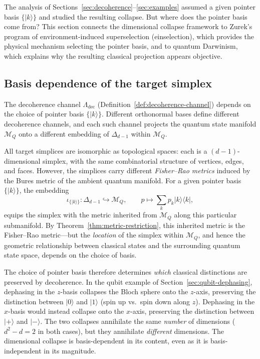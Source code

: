 \documentclass[12pt,a4paper]{article}
\theoremstyle{definition}
\theoremstyle{remark}
\begin{document}
The analysis of Sections~\ref{sec:decoherence}--\ref{sec:examples} assumed a given pointer basis $\{|k\rangle\}$ and studied the resulting collapse.  But where does the pointer basis come from?  This section connects the dimensional collapse framework to Zurek's program of environment-induced superselection (einselection), which provides the physical mechanism selecting the pointer basis, and to quantum Darwinism, which explains why the resulting classical projection appears objective.

\subsection{Basis dependence of the target simplex}
\label{sec:basis-dependence}

The decoherence channel $\Lambda_{\mathrm{dec}}$ (Definition~\ref{def:decoherence-channel}) depends on the choice of pointer basis $\{|k\rangle\}$.  Different orthonormal bases define different decoherence channels, and each such channel projects the quantum state manifold $\mathcal{M}_Q$ onto a different embedding of $\Delta_{d-1}$ within $\mathcal{M}_Q$.

All target simplices are isomorphic as topological spaces: each is a $(d-1)$-dimensional simplex, with the same combinatorial structure of vertices, edges, and faces.  However, the simplices carry different \emph{Fisher--Rao metrics} induced by the Bures metric of the ambient quantum manifold.  For a given pointer basis $\{|k\rangle\}$, the embedding
\begin{equation}
\label{eq:simplex-embedding}
\iota_{\{|k\rangle\}}: \Delta_{d-1} \hookrightarrow \mathcal{M}_Q, \qquad p \mapsto \sum_k p_k |k\rangle\langle k|,
\end{equation}
equips the simplex with the metric inherited from $\mathcal{M}_Q$ along this particular submanifold.  By Theorem~\ref{thm:metric-restriction}, this inherited metric is the Fisher--Rao metric---but the \emph{location} of the simplex within $\mathcal{M}_Q$, and hence the geometric relationship between classical states and the surrounding quantum state space, depends on the choice of basis.

The choice of pointer basis therefore determines \emph{which} classical distinctions are preserved by decoherence.  In the qubit example of Section~\ref{sec:qubit-dephasing}, dephasing in the $z$-basis collapses the Bloch sphere onto the $z$-axis, preserving the distinction between $|0\rangle$ and $|1\rangle$ (spin up vs.\ spin down along $z$).  Dephasing in the $x$-basis would instead collapse onto the $x$-axis, preserving the distinction between $|{+}\rangle$ and $|{-}\rangle$.  The two collapses annihilate the same \emph{number} of dimensions ($d^2 - d = 2$ in both cases), but they annihilate \emph{different} dimensions.  The dimensional collapse is basis-dependent in its content, even as it is basis-independent in its magnitude.
\end{document}
